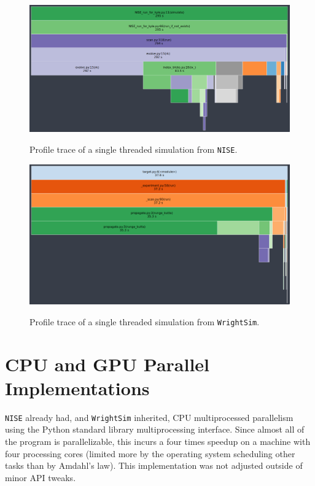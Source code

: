 \documentclass[fontsize=11pt]{scrartcl}
\numberwithin{equation}{section}		%
\numberwithin{figure}{section}			%
\numberwithin{table}{section}				%
\begin{document}
\begin{figure}[!h]
    \centering
    \includegraphics[scale=0.25]{"NISE_prof"}
    \label{fig:snakeviz}
    \caption{Profile trace of a single threaded simulation from \texttt{NISE}.}
\end{figure}
\begin{figure}[!h]
    \centering
    \includegraphics[scale=0.25]{"WrightSim_prof"}
    \label{fig:snakeviz2}
    \caption{Profile trace of a single threaded simulation from \texttt{WrightSim}.}
\end{figure}

\section{CPU and GPU Parallel Implementations}

\texttt{NISE} already had, and \texttt{WrightSim} inherited, CPU multiprocessed parallelism using the Python standard library multiprocessing interface.
Since almost all of the program is parallelizable, this incurs a four times speedup on a machine with four processing cores (limited more by the operating system scheduling other tasks than by Amdahl's law).
This implementation was not adjusted outside of minor API tweaks.
\end{document}
